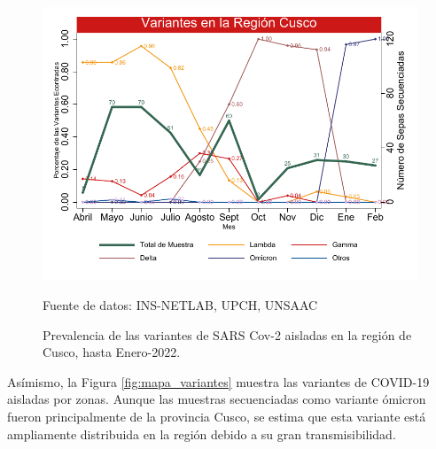\documentclass[12pt,a4paper,openany]{book}
\begin{document}
		\begin{figure}[h]
			\caption{Prevalencia de las variantes de SARS Cov-2 aisladas en la región de Cusco, hasta Enero-2022. }\label{fig:variantes}
			\begin{center}
				\includegraphics[width=0.85\linewidth]{../figuras/variantes.pdf}
			\end{center}
			{\footnotesize {Fuente de datos: INS-NETLAB, UPCH, UNSAAC}}
		\end{figure}
		
	Asímismo, la Figura \ref{fig:mapa_variantes} muestra las variantes de COVID-19 aisladas por zonas. Aunque las muestras secuenciadas como variante ómicron fueron principalmente de la provincia Cusco, se estima que esta variante está ampliamente distribuida en la región debido a su gran transmisibilidad. 
	
\end{document}
